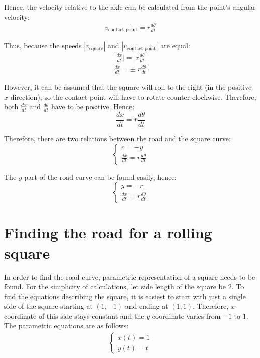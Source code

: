 \documentclass[12pt]{article}
\begin{document}
        Hence, the velocity relative to the axle can be calculated from the point's angular velocity:
        \begin{align}
            v_{\text{contact point}} = r \frac{d\theta}{dt}
        \end{align}            

        Thus, because the speeds $|v_{\text{square}}|$ and $|v_{\text{contact point}}|$ are equal:
        \begin{align}
            \bigl|\frac{dx}{dt}\bigr| = \bigl|r \frac{d\theta}{dt}\bigr| \\
            \frac{dx}{dt} = \pm\; r \frac{d\theta}{dt}
        \end{align}

        However, it can be assumed that the square will roll to the right (in the positive $x$ direction), so the contact point will have to rotate counter-clockwise. Therefore, both $\frac{dx}{dt}$ and $\frac{d\theta}{dt}$ have to be positive. Hence:
        \begin{equation}\label{eq:dxdt}
            \frac{dx}{dt} = r \frac{d\theta}{dt}
        \end{equation}

        Therefore, there are two relations between the road and the square curve:
        \begin{equation}
            \begin{cases}
                r = - y \\
                \frac{dx}{dt} = r \frac{d\theta}{dt}
            \end{cases}
        \end{equation}

        The $y$ part of the road curve can be found easily, hence:
        \begin{equation}\label{eq:road_1}
            \begin{cases}
                y = -r \\
                \frac{dx}{dt} = r \frac{d\theta}{dt}
            \end{cases}
        \end{equation}

    \section{Finding the road for a rolling square}

        In order to find the road curve, parametric representation of a square needs to be found. For the simplicity of calculations, let side length of the square be $2$. To find the equations describing the square, it is easiest to start with just a single side of the square starting at $(1, -1)$ and ending at $(1, 1)$. Therefore, $x$ coordinate of this side stays constant and the $y$ coordinate varies from $-1$ to $1$. The parametric equations are as follows:
        \begin{align}
            \begin{cases}
            x(t) = 1 \\
            y(t) = t
            \end{cases}
        \end{align}
\end{document}
